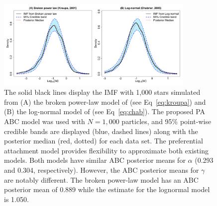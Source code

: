 \documentclass[ejs]{imsart}
\numberwithin{equation}{section}
\theoremstyle{plain}
\begin{document}
\begin{figure} \centering
	\includegraphics[width=0.85\textwidth]{figures/KroupaChabrier.pdf}
	\vspace{-0.1in}
	\caption{The solid black lines display the IMF with 1,000 stars simulated from (A) the broken power-law model of \cite{kroupa2001} (see Eq~\eqref{eq:kroupa}) and (B) the log-normal model of \cite{Chabrier:2003om, Chabrier:2003oq}  (see Eq~\eqref{eq:chab}).  The proposed PA ABC model was used with $N = 1,000$ particles, and 95\% point-wise credible bands are displayed (blue, dashed lines) along with the posterior median (red, dotted) for each data set.  The preferential attachment model provides flexibility to approximate both existing models.
Both models have similar ABC posterior means for $\alpha$ (0.293 and 0.304, respectively).  However, the ABC posterior means for $\gamma$ are notably different.  The broken power-law model has an ABC posterior mean of 0.889 while the estimate for the lognormal model is 1.050.
	}
	\label{fig:otherModels}
\end{figure}
\end{document}
